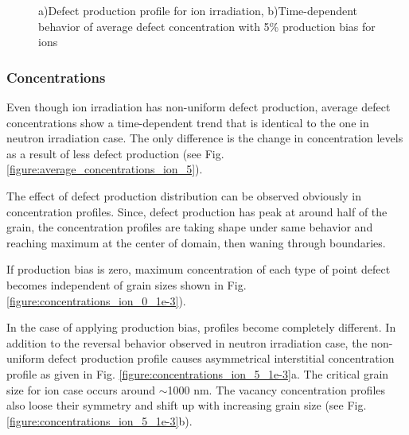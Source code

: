 \documentclass[utf8]{frontiersSCNS} %
\begin{document}
\begin{figure}[h!]
        \caption{a)Defect production profile for ion irradiation, b)Time-dependent behavior of average defect concentration  with 5\% production bias for ions}
        \label{figure:defect_production}
    \end{figure}
\subsubsection{Concentrations}
    Even though ion irradiation has non-uniform defect production, average defect concentrations show a time-dependent trend that is identical to the one in neutron irradiation case. The only difference is the change in concentration levels as a result of less defect production (see Fig. \ref{figure:average_concentrations_ion_5}).

    The effect of defect production distribution can be observed obviously in concentration profiles. Since, defect production has peak at around half of the grain, the concentration profiles are taking shape under same behavior and reaching maximum at the center of domain, then waning through boundaries.

    If production bias is zero, maximum concentration of each type of point defect becomes independent of grain sizes shown in Fig. \ref{figure:concentrations_ion_0_1e-3}).


    In the case of applying production bias, profiles become completely different. In addition to the reversal behavior observed in neutron irradiation case, the non-uniform defect production profile causes asymmetrical interstitial concentration profile as given in Fig. \ref{figure:concentrations_ion_5_1e-3}a. The critical grain size for ion case occurs around ${\sim}$1000 nm. The vacancy concentration profiles also loose their symmetry and shift up with increasing grain size (see Fig. \ref{figure:concentrations_ion_5_1e-3}b).
\end{document}
